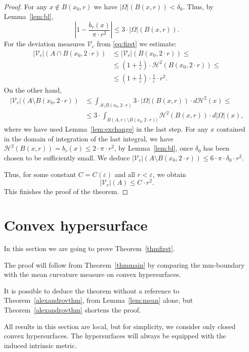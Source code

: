 \documentclass[12pt,leqno,intlimits]{amsart}
\numberwithin{equation}{section}
\theoremstyle{definition}
\theoremstyle{remark}
\newcommand{\tref}[1]{Theorem~\ref{#1}}
\newcommand{\lref}[1]{Lemma~\ref{#1}}
\begin{document}
\begin{proof}
For any $x\notin B (x_0,{r})$ we have $| \Omega |(B(x,r )) < \delta _0$. Thus, by Lemma~\ref{lem:bl}, $$|1-\frac {b_r(x)} {\pi{\cdot}r^2} |
\leq
3\cdot |\Omega | ( B (x,{r})).$$
For the deviation measures $\mathcal{V}_r$ from \eqref{eq:first} we estimate:
\begin{align*}
|\mathcal{V}_r| (A\cap B (x_0,{2{\cdot}r}))
&\leq |\mathcal{V}_r| (B (x_0,{2{\cdot}r})) \leq
\\
&\leq (1+ \tfrac 1 {\varepsilon}) \cdot \mathcal H^2 (B (x_0,{2{\cdot}r})) \leq
\\
&\leq
(1+ \tfrac 1 {\varepsilon}) \cdot \tfrac 1 {\varepsilon} \cdot r^2.
\end{align*}
On the other hand,
\begin{align*}
|\mathcal{V}_r| (A\setminus B (x_0,{2{\cdot}r}))
&\leq
\int _{A \setminus B (x_0,{2{\cdot}r}) } 3 \cdot |\Omega| (B (x,r)) \cdot d\mathcal H^2 (x)
\leq
\\
&\leq 3\cdot \int _{B (A,r)\setminus B (x_0,{2{\cdot}r}))} \mathcal H^2 (B(x,r)) \cdot d|\Omega | (x),
\end{align*}
where we have used \lref{lem:exchange} in the last step.
For any $x$ contained in the domain of integration of the last integral, we have $\mathcal H^2 (B(x,r)) =b_r (x) \leq 2{\cdot}\pi{\cdot}r^2$, by \lref{lem:bl}, once $\delta _0$ has been chosen to be sufficiently small.
We deduce $|\mathcal{V}_r| (A\setminus B (x_0,{2{\cdot}r})) \leq 6 {\cdot}\pi {\cdot}\delta _0 {\cdot} r^2$.

Thus, for some constant $C=C(\varepsilon)$ and all $r<\varepsilon$, we obtain
$$|\mathcal{V}_r|(A) \leq C\cdot r^2.$$
This finishes the proof of the theorem.
\end{proof}

\section{Convex hypersurface} \label{sec:hyper}
In this section we are going to prove \tref{thmfirst}.

The proof will follow from \tref{thmmain} by comparing the mm-boundary with the mean curvature measure on convex hypersurfaces.

It is possible to deduce the theorem without a reference to \tref{alexandrovthm}, from \lref{lem:mean} alone, but \tref{alexandrovthm} shortens the proof.

All results in this section are local,
but for simplicity, we consider only closed convex hypersurfaces.
The hypersurfaces will always be equipped with the induced intrinsic metric.
\end{document}
